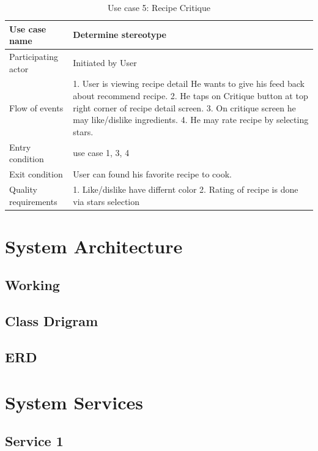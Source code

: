    
    \begin{table}[ht]
    	\centering %
    	\begin{tabular}{p{4cm} p{10cm}}  %
    		\hline\hline %
    		Use case name & Determine stereotype \\ %
    		\hline %
    		
    		Participating actor & Initiated by User \\ %
    		Flow of events & 1. User is viewing recipe detail 
			He wants to give his feed back about recommend recipe. 
			2. He taps on Critique button at top right corner of recipe detail screen. 
			3. On critique screen he may like/dislike ingredients. 
			4. He may rate recipe by selecting stars.\\
    		Entry condition & use case 1, 3, 4\\
    		Exit condition & User can found his favorite recipe to cook.\\
    		Quality requirements & 1. Like/dislike have differnt color 2. Rating of recipe is done via stars selection\\ [1ex] %
    		\hline %
    	\end{tabular}
    	\caption{Use case 5: Recipe Critique}
    	\label{table:recipe_ingredient_critique}
    \end{table}
    
\section{System Architecture}

\subsection{Working}

\subsection{Class Drigram}

\subsection{ERD}

\section{System Services}

\subsection{Service 1}
